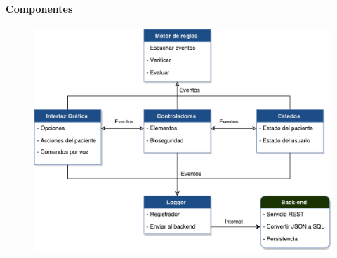 \begin{frame}
\frametitle{\pagetitle}
\framesubtitle{Componentes}
\begin{figure}
\includegraphics[width=\textwidth,height=0.75\textheight,keepaspectratio]{./imagenes/esquema_global.pdf}
\end{figure}
\end{frame}
